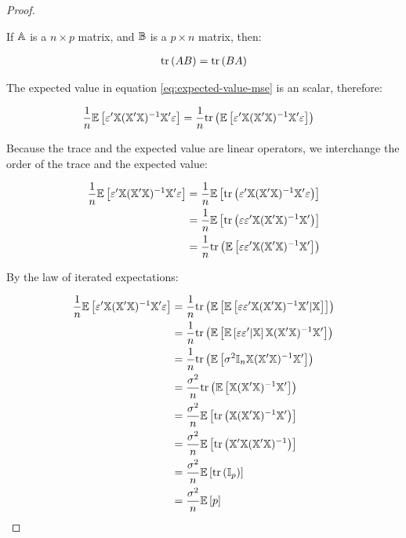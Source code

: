 \begin{proof}
\begin{lemma*}
    If $\mathbb{A}$ is a $n \times p$ matrix, and $\mathbb{B}$  is a $p \times n$ matrix, then:

    \begin{align*}
        \text{tr}\left(AB\right) = \text{tr}\left(BA\right)
    \end{align*}
\end{lemma*}

The expected value in equation \ref{eq:expected-value-mse} is an scalar, therefore:

\begin{align*}
\frac{1}{n} \mathbb{E}\left[
    \varepsilon'\mathbb{X}(\mathbb{X}'\mathbb{X})^{-1}\mathbb{X}'\varepsilon
\right]
&= \frac{1}{n} \text{tr}\left(\mathbb{E}\left[
    \varepsilon'\mathbb{X}(\mathbb{X}'\mathbb{X})^{-1}\mathbb{X}'\varepsilon
\right]\right)
\end{align*}

Because the trace and the expected value are linear operators, we interchange the order of the trace and the expected value:

\begin{align*}
\frac{1}{n} \mathbb{E}\left[
    \varepsilon'\mathbb{X}(\mathbb{X}'\mathbb{X})^{-1}\mathbb{X}'\varepsilon
\right]
&= \frac{1}{n} \mathbb{E}\left[\text{tr}\left(
    \varepsilon'\mathbb{X}(\mathbb{X}'\mathbb{X})^{-1}\mathbb{X}'\varepsilon
\right)\right] \\
&= \frac{1}{n} \mathbb{E}\left[\text{tr}\left(
    \varepsilon\varepsilon'\mathbb{X}(\mathbb{X}'\mathbb{X})^{-1}\mathbb{X}'
\right)\right]\\
&= \frac{1}{n} \text{tr}\left(\mathbb{E}\left[
    \varepsilon\varepsilon'\mathbb{X}(\mathbb{X}'\mathbb{X})^{-1}\mathbb{X}'
\right]\right)
\end{align*}

By the law of iterated expectations:

\begin{align*}
\frac{1}{n} \mathbb{E}\left[
    \varepsilon'\mathbb{X}(\mathbb{X}'\mathbb{X})^{-1}\mathbb{X}'\varepsilon
\right]
&= \frac{1}{n} \text{tr}\left(\mathbb{E}\left[\mathbb{E}\left[
    \varepsilon\varepsilon'\mathbb{X}(\mathbb{X}'\mathbb{X})^{-1}\mathbb{X}'
 | \mathbb{X}\right] \right]\right)\\
&= \frac{1}{n} \text{tr}\left(\mathbb{E}\left[\mathbb{E}\left[
    \varepsilon\varepsilon'| \mathbb{X}\right] \mathbb{X}(\mathbb{X}'\mathbb{X})^{-1}\mathbb{X}'\right]\right)\\
&= \frac{1}{n} \text{tr}\left(
        \mathbb{E}\left[
            \sigma^2 \mathbb{I}_n
            \mathbb{X}(\mathbb{X}'\mathbb{X})^{-1}\mathbb{X}'
        \right]
    \right)\\
&= \frac{\sigma^2}{n} \text{tr}\left(
        \mathbb{E}\left[
            \mathbb{X}(\mathbb{X}'\mathbb{X})^{-1}\mathbb{X}'
        \right]
    \right)\\
&= \frac{\sigma^2}{n} \mathbb{E}\left[
        \text{tr}\left(
            \mathbb{X}(\mathbb{X}'\mathbb{X})^{-1}\mathbb{X}'
        \right)
    \right]\\
&= \frac{\sigma^2}{n} \mathbb{E}\left[
        \text{tr}\left(
            \mathbb{X}'\mathbb{X}(\mathbb{X}'\mathbb{X})^{-1}
        \right)
    \right]\\
&= \frac{\sigma^2}{n} \mathbb{E}\left[
        \text{tr}\left(
           \mathbb{I}_p 
        \right)
    \right]\\
&= \frac{\sigma^2}{n} \mathbb{E}\left[p\right]\\
\end{align*}


\end{proof}
